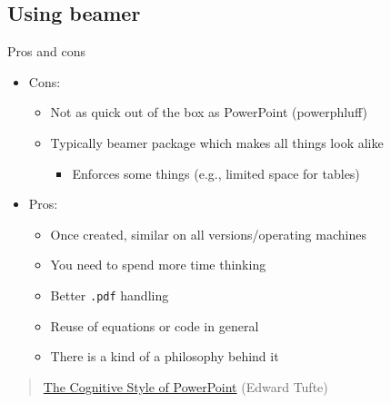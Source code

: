 \documentclass[ignorenonframetext,]{beamer}
\begin{document}
\subsection{Using beamer}
\begin{frame}{Pros and cons}

\begin{itemize}
\item
  Cons:

  \begin{itemize}
  \itemsep1pt\parskip0pt
  \item
    Not as quick out of the box as PowerPoint (powerphluff)
  \item
    Typically beamer package which makes all things look alike

    \begin{itemize}
    \itemsep1pt\parskip0pt
    \item
      Enforces some things (e.g., limited space for tables)
    \end{itemize}
  \end{itemize}
\item
  Pros:

  \begin{itemize}
  \itemsep1pt\parskip0pt
  \item
    Once created, similar on all versions/operating machines
  \item
    You need to spend more time thinking
  \item
    Better \texttt{.pdf} handling
  \item
    Reuse of equations or code in general
  \item
    There is a kind of a philosophy behind it
  \end{itemize}
\end{itemize}

\begin{quote}
\href{http://users.ha.uth.gr/tgd/pt0501/09/Tufte.pdf}{The Cognitive
Style of PowerPoint} (Edward Tufte)
\end{quote}

\end{frame}
\end{document}
